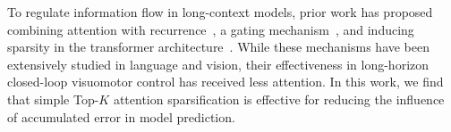 To regulate information flow in long-context models, prior work has proposed combining attention with recurrence~\cite{dai2019transformer}, a gating mechanism~\cite{gatedattention}, and inducing sparsity in the transformer architecture~\cite{zaheer2020big}.
While these mechanisms have been extensively studied in language and vision, their effectiveness in long-horizon closed-loop visuomotor control has received less attention.
In this work, we find that simple Top-$K$ attention sparsification is effective for reducing the influence of accumulated error in model prediction.
